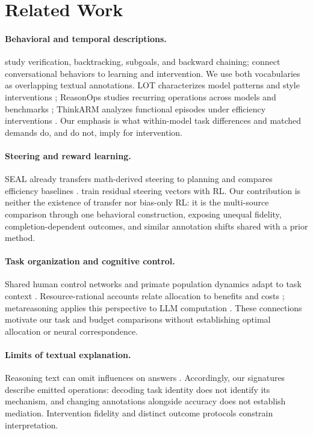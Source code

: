 \section{Related Work}
\paragraph{Behavioral and temporal descriptions.}
\citet{gandhi2025habits} study verification, backtracking, subgoals, and backward chaining; \citet{kim2026society} connect conversational behaviors to learning and intervention. We use both vocabularies as overlapping textual annotations. LOT characterizes model patterns and style interventions \citep{chen2025lot}; ReasonOps studies recurring operations across models and benchmarks \citep{lee2026reasonops}; ThinkARM analyzes functional episodes under efficiency interventions \citep{li2025thinkarm}. Our emphasis is what within-model task differences and matched demands do, and do not, imply for intervention.

\paragraph{Steering and reward learning.}
SEAL already transfers math-derived steering to planning and compares efficiency baselines \citep{chen2025seal}. \citet{sinii2025vectors} train residual steering vectors with RL. Our contribution is neither the existence of transfer nor bias-only RL: it is the multi-source comparison through one behavioral construction, exposing unequal fidelity, completion-dependent outcomes, and similar annotation shifts shared with a prior method.

\paragraph{Task organization and cognitive control.}
Shared human control networks and primate population dynamics adapt to task context \citep{cole2013hubs,mante2013context}. Resource-rational accounts relate allocation to benefits and costs \citep{shenhav2013control,lieder2020resource}; metareasoning applies this perspective to LLM computation \citep{desabbata2024metareasoning}. These connections motivate our task and budget comparisons without establishing optimal allocation or neural correspondence.

\paragraph{Limits of textual explanation.}
Reasoning text can omit influences on answers \citep{turpin2023faithfulness,chen2025faithfulness}. Accordingly, our signatures describe emitted operations: decoding task identity does not identify its mechanism, and changing annotations alongside accuracy does not establish mediation. Intervention fidelity and distinct outcome protocols constrain interpretation.
